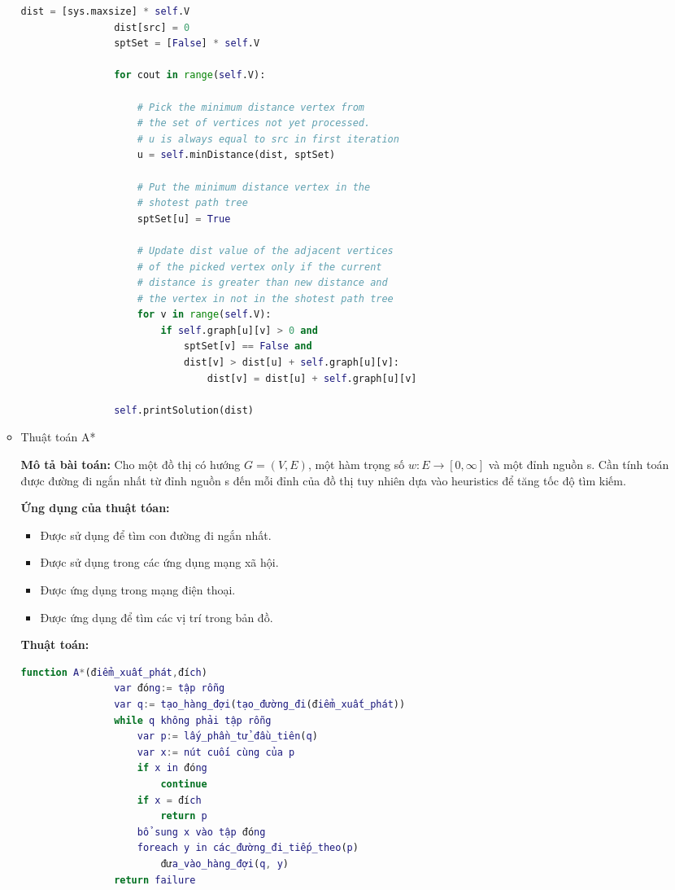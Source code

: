 \begin{itemize}
\begin{itemize}
\begin{lstlisting}[language=Python, caption=Mã giải của thuật toán Dijkstra]
				dist = [sys.maxsize] * self.V
				dist[src] = 0
				sptSet = [False] * self.V
			
				for cout in range(self.V):
			
					# Pick the minimum distance vertex from
					# the set of vertices not yet processed.
					# u is always equal to src in first iteration
					u = self.minDistance(dist, sptSet)
			
					# Put the minimum distance vertex in the
					# shotest path tree
					sptSet[u] = True
			
					# Update dist value of the adjacent vertices
					# of the picked vertex only if the current
					# distance is greater than new distance and
					# the vertex in not in the shotest path tree
					for v in range(self.V):
						if self.graph[u][v] > 0 and
							sptSet[v] == False and
							dist[v] > dist[u] + self.graph[u][v]:
								dist[v] = dist[u] + self.graph[u][v]
			
				self.printSolution(dist)
		\end{lstlisting}
		\item Thuật toán A*
		
		\textbf{Mô tả bài toán:} Cho một đồ thị có hướng $G=(V,E)$, một hàm trọng số $w: E \rightarrow [0,\infty]$ và một đỉnh nguồn s. Cần tính toán được đường đi ngắn nhất từ đỉnh nguồn s đến mỗi đỉnh của đồ thị tuy nhiên dựa vào heuristics để tăng tốc độ tìm kiếm.
		
		\textbf{Ứng dụng của thuật tóan:}
		\begin{itemize}
			\item Được sử dụng để tìm con đường đi ngắn nhất.
			\item Được sử dụng trong các ứng dụng mạng xã hội.
			\item Được ứng dụng trong mạng điện thoại.
			\item Được ứng dụng để tìm các vị trí trong bản đồ.
		\end{itemize}
		
		\textbf{Thuật toán:}
		\begin{lstlisting}[language=Matlab, caption= Mã giải của thuật toán A*]
			function A*(điểm_xuất_phát,đích)
				var đóng:= tập rỗng
				var q:= tạo_hàng_đợi(tạo_đường_đi(điểm_xuất_phát))
				while q không phải tập rỗng
					var p:= lấy_phần_tử_đầu_tiên(q)
					var x:= nút cuối cùng của p
					if x in đóng
						continue
					if x = đích
						return p
					bổ sung x vào tập đóng
					foreach y in các_đường_đi_tiếp_theo(p)
						đưa_vào_hàng_đợi(q, y)
				return failure
		\end{lstlisting}
		
	\end{itemize}
\end{itemize}





